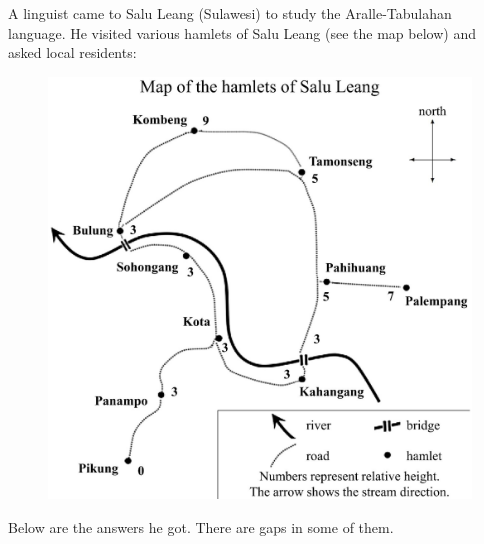 \begin{refsection}
\begin{problem}{\langnameTabaq}{\nameDMirea}{}
\begin{assgts}
\end{assgts}
\end{problem}

\begin{problem}{\langnameAralle}{\nameKGilyarova}{}
A linguist came to Salu Leang (Sulawesi) to study the Aralle-Tabulahan language. He visited various hamlets of Salu Leang (see the map below) and asked local residents:  

\begin{figure}[H]
\includegraphics[width=0.75\linewidth]{images/Aralle_EN.jpg}
\end{figure}

Below are the answers he got. There are gaps in some of them.


\end{problem}
\end{refsection}
